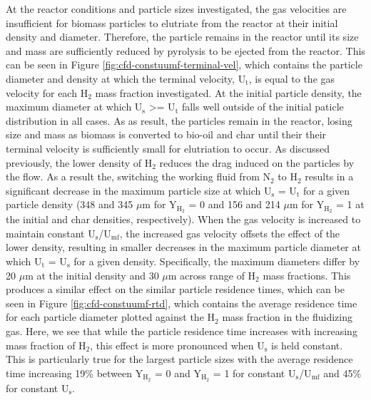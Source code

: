 At the reactor conditions and particle sizes investigated, the gas velocities are insufficient for biomass particles to elutriate from the reactor at their initial density and diameter. Therefore, the particle remains in the reactor until its size and mass are sufficiently reduced by pyrolysis to be ejected from the reactor. This can be seen in Figure \ref{fig:cfd-constuumf-terminal-vel}, which contains the particle diameter and density at which the terminal velocity, U$_\text{t}$, is equal to the gas velocity for each H$_2$ mass fraction investigated. At the initial particle density, the maximum diameter at which U$_\text{s}$ >= U$_\text{t}$ falls well outside of the initial paticle distribution in all cases. As as result, the particles remain in the reactor, losing size and mass as biomass is converted to bio-oil and char until their their terminal velocity is sufficiently small for elutriation to occur. As discussed previously, the lower density of H$_2$ reduces the drag induced on the particles by the flow. As a result the, switching the working fluid from N$_2$ to H$_2$ results in a significant decrease in the maximum particle size at which U$_\text{s}$ = U$_\text{t}$ for a given particle density (348 and 345 $\mu$m for Y$_{\text{H}_2}$ = 0 and 156 and 214 $\mu$m for Y$_{\text{H}_2}$ = 1 at the initial and char densities, respectively). When the gas velocity is increased to maintain constant U$_\text{s}$/U$_\text{mf}$, the increased gas velocity offsets the effect of the lower density, resulting in smaller decreases in the maximum particle diameter at which U$_\text{t}$ = U$_\text{s}$ for a given density. Specifically, the maximum diameters differ by 20 $\mu$m at the initial density and 30 $\mu$m across range of H$_2$ mass fractions. This produces a similar effect on the similar particle residence times, which can be seen in Figure \ref{fig:cfd-constuumf-rtd}, which contains the average residence time for each particle diameter plotted against the H$_2$ mass fraction in the fluidizing gas. Here, we see that while the particle residence time increases with increasing mass fraction of H$_2$, this effect is more pronounced when U$_\text{s}$ is held constant. This is particularly true for the largest particle sizes with the average residence time increasing 19\% between Y$_{\text{H}_2}$ = 0 and Y$_{\text{H}_2}$ = 1 for constant U$_\text{s}$/U$_\text{mf}$ and 45\% for constant U$_\text{s}$.


